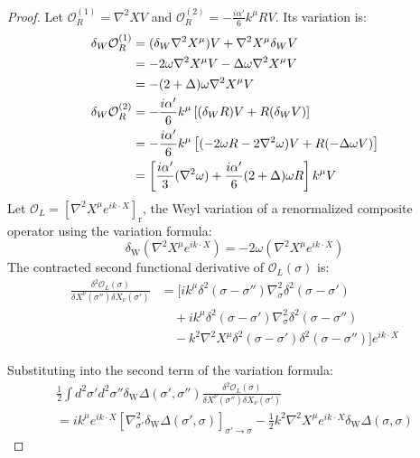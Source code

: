 \begin{tcolorbox}[breakable]
\begin{proof}
			Let $\mathcal{O}_R^{(1)} = \nabla^2XV$ and $\mathcal{O}_R^{(2)} = -\frac{i \alpha'}{6} k^\mu R V$. Its variation is:
			\begin{align}
				\delta_W \mathcal{O}_R^{(1)} &= (\delta_W \nabla^2 X^\mu)V + \nabla^2 X^\mu\delta_W V\notag\\
				&= -2\omega\nabla^2 X^\mu V - \Delta\omega\nabla^2 X^\mu V\notag\\
				& = -(2+\Delta)\omega\nabla^2 X^\mu V\\
				\delta_W \mathcal{O}_R^{(2)} &= -\frac{i \alpha'}{6} k^\mu \left[ (\delta_W R) V + R (\delta_W V) \right] \notag\\
				&= -\frac{i \alpha'}{6} k^\mu \left[ (-2\omega R - 2\nabla^2 \omega) V + R (-\Delta \omega V) \right] \notag\\
				&= \left[\frac{i \alpha'}{3}  (\nabla^2 \omega) + \frac{i \alpha'}{6} (2 + \Delta) \omega R\right] k^\mu V \label{A}
			\end{align}
			Let $\mathcal{O}_L = [\nabla^2 X^\mu e^{ik\cdot X}]_{\text{r}}$, the Weyl variation of a renormalized composite operator using the variation formula:
	\begin{equation}
		\delta_{\mathrm{W}} (\nabla^2 X^\mu e^{ik\cdot X}) = -2\omega (\nabla^2 X^\mu e^{ik\cdot X})
	\end{equation}
	The contracted second functional derivative of $\mathcal{O}_L(\sigma)$ is:
	\begin{align}
		\frac{\delta^2 \mathcal{O}_L(\sigma)}{\delta X^\nu(\sigma'') \delta X_\nu(\sigma')} &= \Big[ ik^\mu \delta^2(\sigma-\sigma'') \nabla^2_\sigma \delta^2(\sigma-\sigma') \nonumber \\
		&\quad + ik^\mu \delta^2(\sigma-\sigma') \nabla^2_\sigma \delta^2(\sigma-\sigma'') \nonumber \\
		&\quad - k^2 \nabla^2 X^\mu \delta^2(\sigma-\sigma') \delta^2(\sigma-\sigma'') \Big] e^{ik\cdot X}
	\end{align}
	
	Substituting into the second term of the variation formula:
	\begin{multline}
	\frac{1}{2} \int d^{2} \sigma' d^{2} \sigma'' \delta_{\mathrm{W}} \Delta\left(\sigma', \sigma''\right) \frac{\delta^2 \mathcal{O}_L(\sigma)}{\delta X^\nu(\sigma'') \delta X_\nu(\sigma')} \\
	= ik^\mu e^{ik\cdot X} \left[ \nabla^2_{\sigma'} \delta_{\mathrm{W}} \Delta(\sigma', \sigma) \right]_{\sigma' \to \sigma} - \frac{1}{2} k^2 \nabla^2 X^\mu e^{ik\cdot X} \delta_{\mathrm{W}} \Delta(\sigma, \sigma)
	\end{multline}
	

\end{proof}
\end{tcolorbox}
